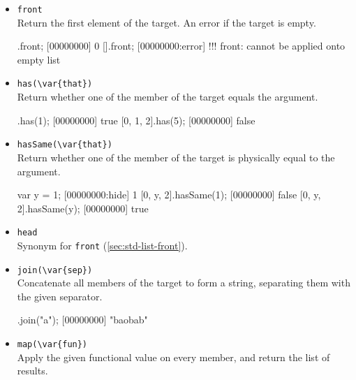 \begin{itemize}
\begin{urbiscript}[firstnumber=last]
\end{urbiscript}

\item \lstinline|front|\\
\label{sec:std-list-front}
Return the first element of the target. An error if the target is
empty.

\begin{urbiscript}[firstnumber=last]
[0, 1, 2].front;
[00000000] 0
[].front;
[00000000:error] !!! front: cannot be applied onto empty list
\end{urbiscript}

\item \lstinline|has(\var{that})|\\
Return whether one of the member of the target equals the argument.

\begin{urbiscript}[firstnumber=last]
[0, 1, 2].has(1);
[00000000] true
[0, 1, 2].has(5);
[00000000] false
\end{urbiscript}

\item \lstinline|hasSame(\var{that})|\\

Return whether one of the member of the target is physically equal to
the argument.

\begin{urbiscript}[firstnumber=last]
var y = 1;
[00000000:hide] 1
[0, y, 2].hasSame(1);
[00000000] false
[0, y, 2].hasSame(y);
[00000000] true
\end{urbiscript}

\item \lstinline|head|\\
Synonym for \lstinline|front| (\autoref{sec:std-list-front}).

\item \lstinline|join(\var{sep})|\\
Concatenate all members of the target to form a string, separating
them with the given separator.

\begin{urbiscript}[firstnumber=last]
["b", "ob", "b"].join("a");
[00000000] "baobab"
\end{urbiscript}

\item \lstinline|map(\var{fun})|\\
Apply the given functional value on every member, and return the list
of results.



\end{itemize}
